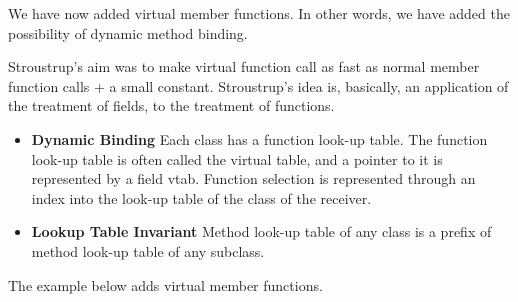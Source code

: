 We have now added virtual member functions.
In other words, we have added the possibility of dynamic 
method binding. 

Stroustrup’s aim was to make virtual function call as fast as 
normal member function calls + a small constant. 
Stroustrup’s idea is, basically, an application of the 
treatment of fields, to the treatment of functions. 



\begin{itemize}   
\renewcommand{\labelitemi}{$\Box$}
\item \textbf{Dynamic Binding} Each class has a function look-up table. 
The function look-up table is often called 
the virtual table, and a pointer to it is represented by a 
field vtab. Function selection is represented through an index into 
the look-up table of the class of the receiver. 

\item \textbf{Lookup Table Invariant} Method look-up table of any 
class is a prefix of method look-up table of any 
subclass. 
\end{itemize} 

\frmrule

\begin{example}
The example below adds virtual member functions. 

\end{example}


